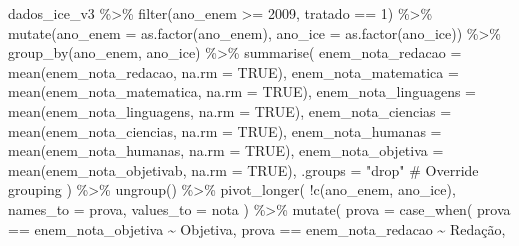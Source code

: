 \documentclass[
  letterpaper,
  DIV=11,
  numbers=noendperiod]{scrartcl}
\newenvironment{Shaded}{\begin{snugshade}}{\end{snugshade}}
\newcommand{\AttributeTok}[1]{\textcolor[rgb]{0.40,0.45,0.13}{#1}}
\newcommand{\CommentTok}[1]{\textcolor[rgb]{0.37,0.37,0.37}{#1}}
\newcommand{\ConstantTok}[1]{\textcolor[rgb]{0.56,0.35,0.01}{#1}}
\newcommand{\DecValTok}[1]{\textcolor[rgb]{0.68,0.00,0.00}{#1}}
\newcommand{\FunctionTok}[1]{\textcolor[rgb]{0.28,0.35,0.67}{#1}}
\newcommand{\NormalTok}[1]{\textcolor[rgb]{0.00,0.23,0.31}{#1}}
\newcommand{\SpecialCharTok}[1]{\textcolor[rgb]{0.37,0.37,0.37}{#1}}
\newcommand{\StringTok}[1]{\textcolor[rgb]{0.13,0.47,0.30}{#1}}
\begin{document}
\begin{Shaded}
\begin{Highlighting}[]
\NormalTok{dados\_ice\_v3 }\SpecialCharTok{\%\textgreater{}\%}
  \FunctionTok{filter}\NormalTok{(ano\_enem }\SpecialCharTok{\textgreater{}=} \DecValTok{2009}\NormalTok{, tratado }\SpecialCharTok{==} \DecValTok{1}\NormalTok{) }\SpecialCharTok{\%\textgreater{}\%}
  \FunctionTok{mutate}\NormalTok{(}\AttributeTok{ano\_enem =} \FunctionTok{as.factor}\NormalTok{(ano\_enem), }\AttributeTok{ano\_ice =} \FunctionTok{as.factor}\NormalTok{(ano\_ice)) }\SpecialCharTok{\%\textgreater{}\%}
  \FunctionTok{group\_by}\NormalTok{(ano\_enem, ano\_ice) }\SpecialCharTok{\%\textgreater{}\%}
  \FunctionTok{summarise}\NormalTok{(}
    \AttributeTok{enem\_nota\_redacao =} \FunctionTok{mean}\NormalTok{(enem\_nota\_redacao, }\AttributeTok{na.rm =} \ConstantTok{TRUE}\NormalTok{),}
    \AttributeTok{enem\_nota\_matematica =} \FunctionTok{mean}\NormalTok{(enem\_nota\_matematica, }\AttributeTok{na.rm =} \ConstantTok{TRUE}\NormalTok{),}
    \AttributeTok{enem\_nota\_linguagens =} \FunctionTok{mean}\NormalTok{(enem\_nota\_linguagens, }\AttributeTok{na.rm =} \ConstantTok{TRUE}\NormalTok{),}
    \AttributeTok{enem\_nota\_ciencias =} \FunctionTok{mean}\NormalTok{(enem\_nota\_ciencias, }\AttributeTok{na.rm =} \ConstantTok{TRUE}\NormalTok{),}
    \AttributeTok{enem\_nota\_humanas =} \FunctionTok{mean}\NormalTok{(enem\_nota\_humanas, }\AttributeTok{na.rm =} \ConstantTok{TRUE}\NormalTok{),}
    \AttributeTok{enem\_nota\_objetiva =} \FunctionTok{mean}\NormalTok{(enem\_nota\_objetivab, }\AttributeTok{na.rm =} \ConstantTok{TRUE}\NormalTok{),}
    \AttributeTok{.groups =} \StringTok{"drop"}  \CommentTok{\# Override grouping}
\NormalTok{  ) }\SpecialCharTok{\%\textgreater{}\%}
  \FunctionTok{ungroup}\NormalTok{() }\SpecialCharTok{\%\textgreater{}\%}
  \FunctionTok{pivot\_longer}\NormalTok{(}
    \SpecialCharTok{!}\FunctionTok{c}\NormalTok{(ano\_enem, ano\_ice),}
    \AttributeTok{names\_to =} \StringTok{\textquotesingle{}prova\textquotesingle{}}\NormalTok{,}
    \AttributeTok{values\_to =} \StringTok{\textquotesingle{}nota\textquotesingle{}}
\NormalTok{  ) }\SpecialCharTok{\%\textgreater{}\%}
  \FunctionTok{mutate}\NormalTok{(}
    \AttributeTok{prova =} \FunctionTok{case\_when}\NormalTok{(}
\NormalTok{      prova }\SpecialCharTok{==} \StringTok{\textquotesingle{}enem\_nota\_objetiva\textquotesingle{}} \SpecialCharTok{\textasciitilde{}} \StringTok{\textquotesingle{}Objetiva\textquotesingle{}}\NormalTok{,}
\NormalTok{      prova }\SpecialCharTok{==} \StringTok{\textquotesingle{}enem\_nota\_redacao\textquotesingle{}} \SpecialCharTok{\textasciitilde{}} \StringTok{\textquotesingle{}Redação\textquotesingle{}}\NormalTok{,}

\end{Highlighting}
\end{Shaded}
\end{document}
